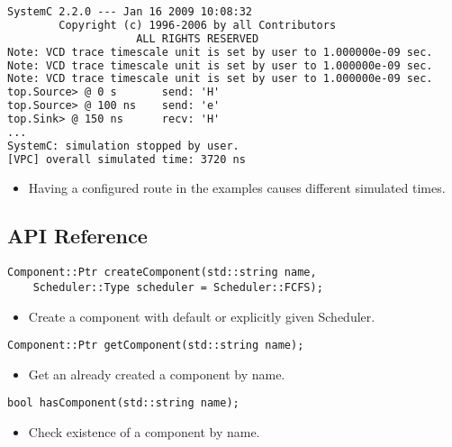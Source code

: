 \begin{frame}[fragile=singleslide]
\begin{lstlisting}[language=xml]
             SystemC 2.2.0 --- Jan 16 2009 10:08:32
        Copyright (c) 1996-2006 by all Contributors
                    ALL RIGHTS RESERVED            
Note: VCD trace timescale unit is set by user to 1.000000e-09 sec.
Note: VCD trace timescale unit is set by user to 1.000000e-09 sec.
Note: VCD trace timescale unit is set by user to 1.000000e-09 sec.
top.Source> @ 0 s       send: 'H'
top.Source> @ 100 ns    send: 'e'
top.Sink> @ 150 ns      recv: 'H'
...
SystemC: simulation stopped by user.
[VPC] overall simulated time: 3720 ns
\end{lstlisting}
\begin{itemize}
\item Having a configured route in the examples causes different simulated times.
\end{itemize}
\end{frame}


\subsection{API Reference}


\begin{frame}[fragile=singleslide]
\begin{lstlisting}
Component::Ptr createComponent(std::string name,
    Scheduler::Type scheduler = Scheduler::FCFS);
\end{lstlisting}
\begin{itemize}
\item Create a component with default or explicitly given Scheduler.
\end{itemize}
\begin{lstlisting}
Component::Ptr getComponent(std::string name);
\end{lstlisting}
\begin{itemize}
\item Get an already created a component by name.
\end{itemize}
\begin{lstlisting}
bool hasComponent(std::string name);
\end{lstlisting}
\begin{itemize}
\item Check existence of a component by name.
\end{itemize}
\end{frame}



